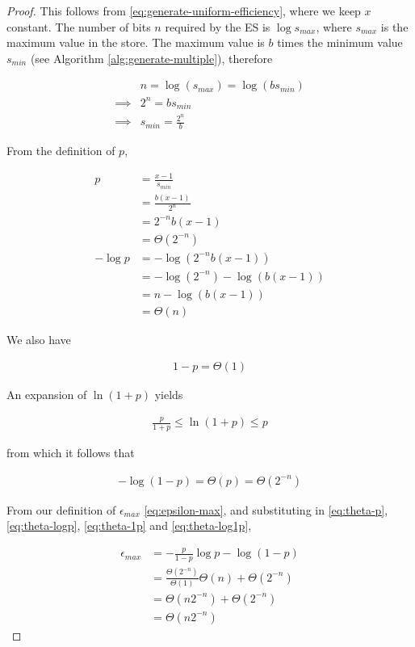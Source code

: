 \documentclass[lettersize,journal]{IEEEtran}
\begin{document}
\begin{proof}
This follows from \eqref{eq:generate-uniform-efficiency}, where we keep $x$ constant. The number of bits $n$ required by the ES is $\log s_{max}$, where $s_{max}$ is the maximum value in the store. The maximum value is $b$ times the minimum value $s_{min}$ (see Algorithm \ref{alg:generate-multiple}), therefore

\begin{align}
        &    n        = \log(s_{max}) = \log(bs_{min}) \\
\implies & 2^n      = bs_{min} \\
\implies &  s_{min} = \frac{2^n}{b}
\end{align}

From the definition of $p$,

\begin{align}
p   & = \frac{x-1}{s_{min}} \\
    & = \frac{b(x-1)}{2^n} \\
    & = 2^{-n}b(x-1) \\
    & = \Theta(2^{-n}) \label{eq:theta-p}\\
-\log p 
    & = -\log (2^{-n}b(x-1)) \\
    & = -\log (2^{-n}) - \log(b(x-1)) \\
    & = n - \log(b(x-1)) \\
    & = \Theta(n) \label{eq:theta-logp}
\end{align}

We also have

\begin{align}
1-p = \Theta(1)
\label{eq:theta-1p}
\end{align}

An expansion of $\ln (1+p)$ yields

\begin{align}
\frac{p}{1+p} \le \ln (1+p) \le p
\end{align}

from which it follows that

\begin{align}
-\log(1-p) = \Theta(p) = \Theta(2^{-n})
\label{eq:theta-log1p}
\end{align}

From our definition of $\epsilon_{max}$ \eqref{eq:epsilon-max}, and substituting in \eqref{eq:theta-p}, \eqref{eq:theta-logp}, \eqref{eq:theta-1p} and \eqref{eq:theta-log1p},

\begin{align}
\epsilon_{max} 
    & = -\frac{p}{1-p}\log p - \log(1-p) \\
    & = \frac{\Theta(2^{-n})}{\Theta(1)}\Theta(n) + \Theta(2^{-n}) \\
    & = \Theta(n2^{-n}) + \Theta(2^{-n}) \\
    & = \Theta(n2^{-n}) \label{eq:theta-e}
\end{align}


\end{proof}
\end{document}
